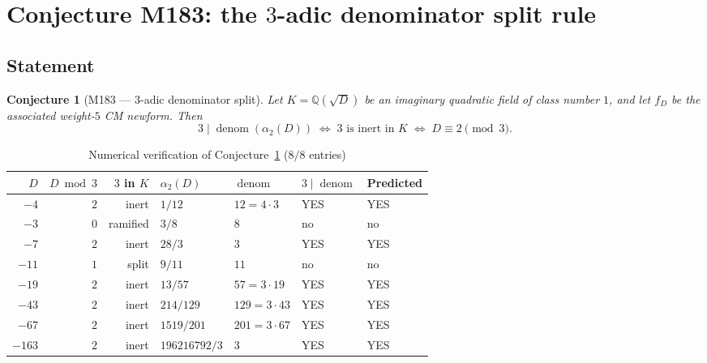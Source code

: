 \documentclass[12pt]{amsart}
\newtheorem{conjecture}[theorem]{Conjecture}
\theoremstyle{definition}
\DeclareMathOperator{\denom}{denom}
\newcommand{\Q}{\mathbb{Q}}
\begin{document}
\section{Conjecture M183: the $3$-adic denominator split rule}
\label{sec:M183}

\subsection{Statement}

\begin{conjecture}[M183 --- $3$-adic denominator split]
  \label{conj:M183}
  Let $K = \Q(\sqrt{D})$ be an imaginary quadratic field of class number $1$,
  and let $f_D$ be the associated weight-$5$ CM newform.
  Then
  \[
    3 \mid \denom(\alpha_2(D)) \;\iff\; \text{$3$ is inert in $K$}
    \;\iff\; D \equiv 2 \pmod{3}.
  \]
\end{conjecture}

\begin{table}[h]
  \caption{Numerical verification of Conjecture~\ref{conj:M183} ($8/8$ entries)}
  \label{tab:M183}
  \renewcommand{\arraystretch}{1.25}
  \begin{tabular}{rrrllll}
    \toprule
    $D$ & $D \bmod 3$ & $3$ in $K$ & $\alpha_2(D)$ & $\denom$ & $3 \mid \denom$ & Predicted \\
    \midrule
    $-4$  & $2$ & inert    & $1/12$         & $12 = 4\cdot 3$  & YES & YES \\
    $-3$  & $0$ & ramified & $3/8$          & $8$              & no  & no  \\
    $-7$  & $2$ & inert    & $28/3$         & $3$              & YES & YES \\
    $-11$ & $1$ & split    & $9/11$         & $11$             & no  & no  \\
    $-19$ & $2$ & inert    & $13/57$        & $57 = 3\cdot 19$ & YES & YES \\
    $-43$ & $2$ & inert    & $214/129$      & $129 = 3\cdot 43$& YES & YES \\
    $-67$ & $2$ & inert    & $1519/201$     & $201 = 3\cdot 67$& YES & YES \\
    $-163$& $2$ & inert    & $196216792/3$  & $3$              & YES & YES \\
    \bottomrule
  \end{tabular}
\end{table}
\end{document}
